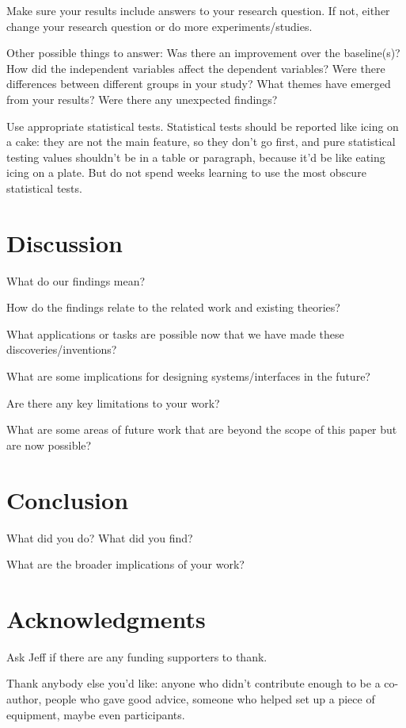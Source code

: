 \documentclass[manuscript,review,anonymous]{acmart}
\begin{document}
Make sure your results include answers to your research question.
If not, either change your research question or do more experiments/studies.

Other possible things to answer:
Was there an improvement over the baseline(s)?
How did the independent variables affect the dependent variables?
Were there differences between different groups in your study?
What themes have emerged from your results?
Were there any unexpected findings?

Use appropriate statistical tests.
Statistical tests should be reported like icing on a cake: they are not the main feature, so they don't go first, and pure statistical testing values shouldn't be in a table or paragraph, because it'd be like eating icing on a plate.
But do not spend weeks learning to use the most obscure statistical tests.

\section{Discussion}
What do our findings mean?

How do the findings relate to the related work and existing theories?

What applications or tasks are possible now that we have made these discoveries/inventions?

What are some implications for designing systems/interfaces in the future?

Are there any key limitations to your work?

What are some areas of future work that are beyond the scope of this paper but are now possible?

\section{Conclusion}
What did you do?
What did you find?

What are the broader implications of your work?

\section{Acknowledgments}

Ask Jeff if there are any funding supporters to thank.

Thank anybody else you'd like: anyone who didn't contribute enough to be a co-author, people who gave good advice, someone who helped set up a piece of equipment, maybe even participants.



\end{document}
